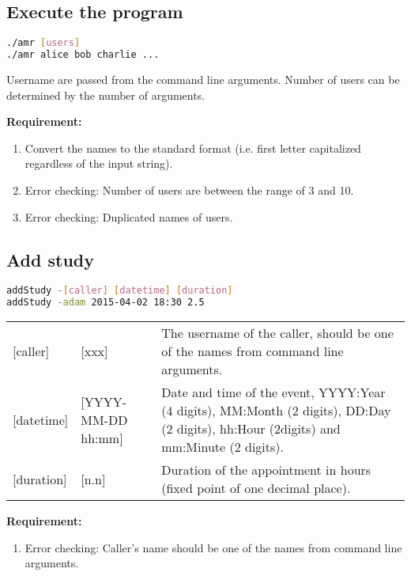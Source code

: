 \documentclass[12pt,a4paper]{report}
\begin{document}
\subsection{Execute the program}
\begin{lstlisting}[language=bash,basicstyle=\ttfamily,keywordstyle=\bfseries]
./amr [users]
./amr alice bob charlie ...
\end{lstlisting}
Username are passed from the command line arguments. Number of users can be determined by the number of arguments. 

\textbf{Requirement:}
\begin{enumerate}
\item Convert the names to the standard format (i.e. first letter capitalized regardless of the input string).
\item Error checking: Number of users are between the range of 3 and 10.
\item Error checking: Duplicated names of users.
\end{enumerate}

\subsection{Add study}
\begin{lstlisting}[language=bash,basicstyle=\ttfamily,keywordstyle=\bfseries]
addStudy -[caller] [datetime] [duration]
addStudy -adam 2015-04-02 18:30 2.5
\end{lstlisting}

\begin{table}[h]
\begin{tabular}{lll}
{[}caller{]} & {[}xxx{]} & The username of the caller, should be one of the names from command line arguments. \\
{[}datetime{]} & {[}YYYY-MM-DD hh:mm{]} & \parbox[t]{15cm}{Date and time of the event, YYYY:Year (4 digits), MM:Month (2 digits), DD:Day (2 digits), hh:Hour (2digits) and mm:Minute (2 digits).} \\
{[}duration{]}  & {[}n.n{]} & Duration of the appointment in hours (fixed point of one decimal place).
\end{tabular}
\end{table}

\textbf{Requirement:}
\begin{enumerate}
\item Error checking: Caller's name should be one of the names from command line arguments.
\end{enumerate}
\end{document}
